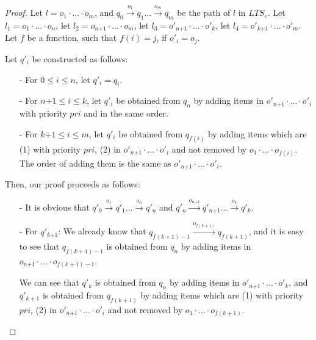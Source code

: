 \begin {proof}
Let $l=o_1 \cdot \ldots \cdot o_m$, and $q_0 \xrightarrow{o_1} q_1 \ldots \xrightarrow{o_m} q_m$ be the path of $l$ in $\textit{LTS}_e$. Let $l_1 = o_1 \cdot \ldots \cdot o_n$, let $l_2 = o_{\textit{n+1}} \cdot \ldots \cdot o_m$, let $l_3 = o'_{\textit{n+1}} \cdot \ldots \cdot o'_k$, let $l_4 = o'_{\textit{k+1}} \cdot \ldots \cdot o'_m$. Let $f$ be a function, such that $f(i)=j$, if $o'_i = o_j$.

Let $q'_i$ be constructed as follows:

\begin{itemize}
\setlength{\itemsep}{0.5pt}
\item[-] For $0 \leq i \leq n$, let $q'_i = q_i$.

\item[-] For $\textit{n+1} \leq i \leq k$, let $q'_i$ be obtained from $q_n$ by adding items in $o'_{\textit{n+1}} \cdot \ldots \cdot o'_i$ with priority $\textit{pri}$ and in the same order.

\item[-] For $\textit{k+1} \leq i \leq m$, let $q'_i$ be obtained from $q_{f(i)}$ by adding items which are (1) with priority $\textit{pri}$, (2) in $o'_{\textit{n+1}} \cdot \ldots \cdot o'_i$ and not removed by $o_1 \cdot \ldots \cdot o_{f(i)}$. The order of adding them is the same as $o'_{\textit{n+1}} \cdot \ldots \cdot o'_i$.
\end{itemize}

Then, our proof proceeds as follows:

\begin{itemize}
\setlength{\itemsep}{0.5pt}
\item[-] It is obvious that $q'_0 \xrightarrow{o_1} q'_1 \ldots \xrightarrow{o_n} q'_n$ and $q'_n \xrightarrow{o_{\textit{n+1}}} q'_{\textit{n+1}} \ldots \xrightarrow{o_k} q'_k$.

\item[-] For $q'_{\textit{k+1}}$: We already know that $q_{f(k+1)-1} \xrightarrow{o_{f(k+1)}} q_{f(k+1)}$, and it is easy to see that $q_{f(k+1)-1}$ is obtained from $q_n$ by adding items in $o_{\textit{n+1}} \cdot \ldots \cdot o_{f(k+1)-1}$.

    We can see that $q'_k$ is obtained from $q_n$ by adding items in $o'_{\textit{n+1}} \cdot \ldots \cdot o'_k$, and $q'_{k+1}$ is obtained from $q_{f(k+1)}$ by adding items which are (1) with priority $\textit{pri}$, (2) in $o'_{\textit{n+1}} \cdot \ldots \cdot o'_i$ and not removed by $o_1 \cdot \ldots \cdot o_{f(k+1)}$.


\end{itemize}
\end{proof}
